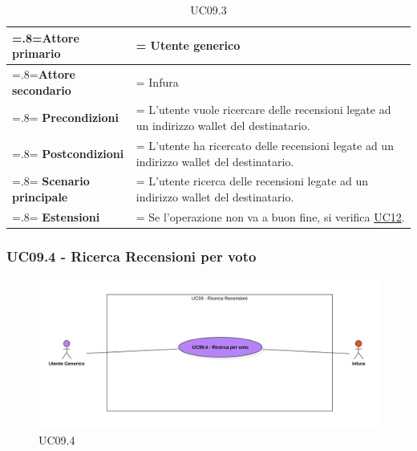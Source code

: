             \begin{table}[H]
                \centering
                \renewcommand{\arraystretch}{1.8}
                \renewcommand\tabularxcolumn[1]{m{#1}}
                \begin{tabularx}{0.9\textwidth} {
                    >{\hsize=.8\hsize\linewidth=\hsize}X
                    >{\hsize=1.2\hsize\linewidth=\hsize}X}
                    \hline
                    \textbf{Attore primario} & Utente generico \\
                    \hline
                    \textbf{Attore secondario} & Infura \\
                    \hline
                    \textbf{Precondizioni} & L'utente vuole ricercare delle recensioni legate ad un indirizzo wallet del destinatario. \\
                    \hline
                    \textbf{Postcondizioni} & L'utente ha ricercato delle recensioni legate ad un indirizzo wallet del destinatario. \\
                    \hline
                    \textbf{Scenario principale} & L'utente ricerca delle recensioni legate ad un indirizzo wallet del destinatario.\\
                    \hline
                    \textbf{Estensioni} & Se l'operazione non va a buon fine, si verifica \hyperref[UC12]{UC12}. \\
                    \hline
                \end{tabularx}
                \caption{UC09.3}
            \end{table}

        \subsubsection{UC09.4 - Ricerca Recensioni per voto}
        \label{UC09.4}

            \begin{figure}[H]
                \centering
                \includegraphics[scale=0.6]{src/img/UC09.4.png}
                \caption{UC09.4}
            \end{figure}

